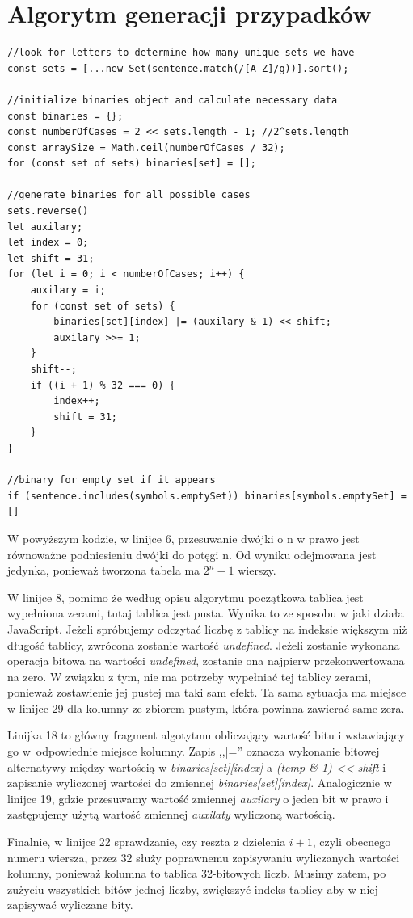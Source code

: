 \documentclass{SGGW-thesis}
\begin{document}
\section{Algorytm generacji przypadków}

\begin{lstlisting}[style=JavaScript, caption={Kod generujący słownik tablic wszystkich możliwych przyadków}]
//look for letters to determine how many unique sets we have
const sets = [...new Set(sentence.match(/[A-Z]/g))].sort();

//initialize binaries object and calculate necessary data
const binaries = {};
const numberOfCases = 2 << sets.length - 1; //2^sets.length
const arraySize = Math.ceil(numberOfCases / 32);
for (const set of sets) binaries[set] = [];

//generate binaries for all possible cases
sets.reverse()
let auxilary;
let index = 0;
let shift = 31;
for (let i = 0; i < numberOfCases; i++) {
    auxilary = i;
    for (const set of sets) {
        binaries[set][index] |= (auxilary & 1) << shift;
        auxilary >>= 1;
    }
    shift--;
    if ((i + 1) % 32 === 0) {
        index++;
        shift = 31;
    }
}

//binary for empty set if it appears
if (sentence.includes(symbols.emptySet)) binaries[symbols.emptySet] = []
\end{lstlisting}
\newpage
\begin{paragraph}{}
W powyższym kodzie, w linijce 6, przesuwanie dwójki o n w prawo jest równoważne podniesieniu dwójki do potęgi n. Od wyniku odejmowana jest jedynka, ponieważ tworzona tabela ma $2^{n}-1$ wierszy.

W linijce 8, pomimo że według opisu algorytmu początkowa tablica jest wypełniona zerami, tutaj tablica jest pusta. Wynika to ze sposobu w jaki działa JavaScript. Jeżeli spróbujemy odczytać liczbę z tablicy na indeksie większym niż długość tablicy, zwrócona zostanie wartość \emph{undefined}. Jeżeli zostanie wykonana operacja bitowa na wartości \emph{undefined}, zostanie ona najpierw przekonwertowana na zero. W związku z tym, nie ma potrzeby wypełniać tej tablicy zerami, ponieważ zostawienie jej pustej ma taki sam efekt. Ta sama sytuacja ma miejsce w linijce 29 dla kolumny ze zbiorem pustym, która powinna zawierać same zera. 

Linijka 18 to główny fragment algotytmu obliczający wartość bitu i wstawiający go w~odpowiednie miejsce kolumny. Zapis ,,|='' oznacza wykonanie bitowej alternatywy między wartością w \emph{binaries[set][index]} a \emph{(temp \& 1) << shift} i zapisanie wyliczonej wartości do zmiennej \emph{binaries[set][index]}. Analogicznie w linijce 19, gdzie przesuwamy wartość zmiennej \emph{auxilary} o jeden bit w prawo i zastępujemy użytą wartość zmiennej \emph{auxilaty} wyliczoną wartością.

Finalnie, w linijce 22 sprawdzanie, czy reszta z dzielenia $i+1$, czyli obecnego numeru wiersza, przez $32$ służy poprawnemu zapisywaniu wyliczanych wartości kolumny, ponieważ kolumna to tablica 32-bitowych liczb. Musimy zatem, po zużyciu wszystkich bitów jednej liczby, zwiększyć indeks tablicy aby w niej zapisywać wyliczane bity.
\end{paragraph}
\end{document}
